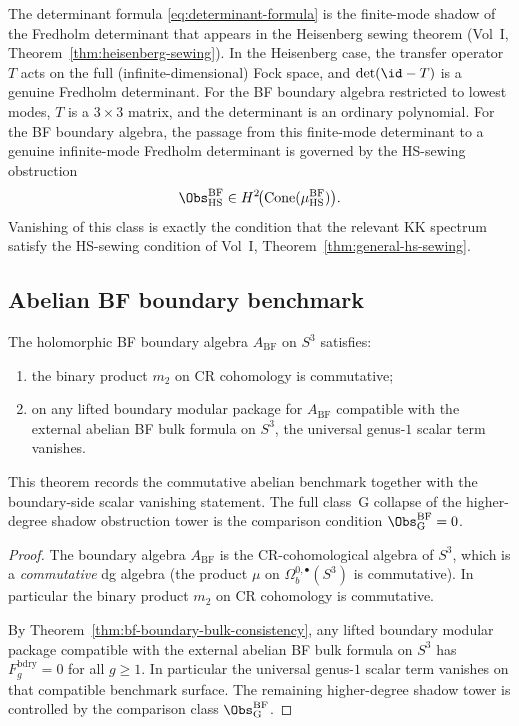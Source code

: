\begin{remark}
The determinant formula \eqref{eq:determinant-formula} is the finite-mode shadow
of the Fredholm determinant that appears in the Heisenberg sewing theorem
(Vol~I, Theorem~\ref*{thm:heisenberg-sewing}). In the Heisenberg case, the
transfer operator $T$ acts on the full (infinite-dimensional) Fock space, and
$\det(\id - T)$ is a genuine Fredholm determinant. For the BF boundary algebra
restricted to lowest modes, $T$ is a $3 \times 3$ matrix, and the determinant is
an ordinary polynomial. For the BF boundary algebra, the passage from this
finite-mode determinant to a genuine infinite-mode Fredholm determinant is
governed by the HS-sewing obstruction
\[
\Obs^{\mathrm{BF}}_{\mathrm{HS}}\in
H^2\!\bigl(\Cone(\mu^{\mathrm{BF}}_{\mathrm{HS}})\bigr).
\]
Vanishing of this class is exactly the condition that the relevant KK spectrum
satisfy the HS-sewing condition of Vol~I,
Theorem~\ref*{thm:general-hs-sewing}.
\end{remark}

\subsection{Abelian BF boundary benchmark}

\begin{theorem}
\label{thm:bf-shadow-depth}
The holomorphic BF boundary algebra $A_{\mathrm{BF}}$ on $S^3$ satisfies:
\begin{enumerate}[label=\textup{(\roman*)}]
\item the binary product $m_2$ on CR cohomology is commutative;
\item on any lifted boundary modular package for $A_{\mathrm{BF}}$ compatible with the
 external abelian BF bulk formula on $S^3$, the universal genus-$1$ scalar term
 vanishes.
\end{enumerate}
This theorem records the commutative abelian benchmark together with the
boundary-side scalar vanishing statement. The full class~G collapse of the
higher-degree shadow obstruction tower is the comparison condition
$\Obs^{\mathrm{BF}}_{\mathrm{G}}=0$.
\end{theorem}

\begin{proof}
The boundary algebra $A_{\mathrm{BF}}$ is the CR-cohomological algebra of $S^3$,
which is a \emph{commutative} dg algebra (the product $\mu$ on
$\Omega_b^{0,\bullet}(S^3)$ is commutative). In particular the binary product
$m_2$ on CR cohomology is commutative.

By Theorem~\ref{thm:bf-boundary-bulk-consistency}, any lifted boundary modular
package compatible with the external abelian BF bulk formula on $S^3$ has
$F_g^{\mathrm{bdry}}=0$ for all $g \geq 1$. In particular the universal genus-$1$
scalar term vanishes on that compatible benchmark surface. The remaining
higher-degree shadow tower is controlled by the comparison class
$\Obs^{\mathrm{BF}}_{\mathrm{G}}$.
\end{proof}

